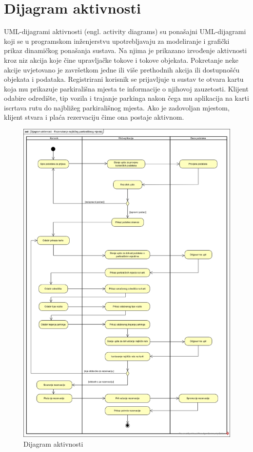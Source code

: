 \eject 

\section{Dijagram aktivnosti}

UML-dijagrami aktivnosti (engl. activity diagrams) su ponašajni UML-dijagrami koji se u programskom inženjerstvu upotrebljavaju za modeliranje i grafički prikaz dinamičkog ponašanja sustava. 
Na njima je prikazano izvođenje aktivnosti kroz niz akcija koje čine upravljačke tokove i tokove objekata. Pokretanje neke akcije uvjetovano je završetkom jedne ili više prethodnih akcija ili dostupnošću objekata i podataka. Registrirani korisnik se prijavljuje u sustav te otvara kartu koja mu prikazuje parkirališna mjesta te informacije o njihovoj zauzetosti. Klijent odabire odredište, tip vozila i trajanje parkinga nakon čega mu aplikacija na karti iscrtava rutu do najbližeg parkirališnog mjesta. Ako je zadovoljan mjestom, klijent stvara i plaća rezervaciju čime ona postaje aktivnom.


\begin{figure}[H]
	\includegraphics[width=\textwidth, height=\textwidth]{slike/dijagram_aktivnosti.jpg} %
	\centering
	\caption{Dijagram aktivnosti}
	\label{fig:dijagramaktivnosti}
\end{figure}


